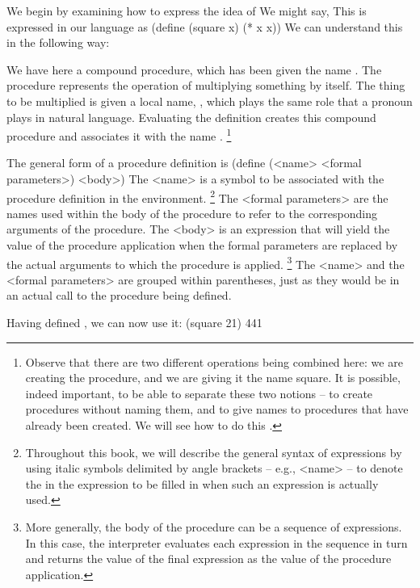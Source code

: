 We begin by examining how to express the idea of 
We might say, 
This is expressed in our language as
\startcode
(define (square x) (* x x))
\stopcode
We can understand this in the following way:

We have here a compound procedure, which has been given the name .
The procedure represents the operation of multiplying something by itself.
The thing to be multiplied is given a local name, ,
which plays the same role that a pronoun plays in natural language.
Evaluating the definition creates this compound procedure and associates it with the name .
\footnote{%
   Observe that there are two different operations being combined here:
   we are creating the procedure, and we are giving it the name square.
   It is possible, indeed important, to be able to separate these two notions
   -- to create procedures without naming them,
   and to give names to procedures that have already been created.
   We will see how to do this .
}

The general form of a procedure definition is
\startcode
(define (<name> <formal parameters>) <body>)
\stopcode
The <name> is a symbol to be associated with the procedure definition in the environment.
\footnote{%
   Throughout this book,
   we will describe the general syntax of expressions by using italic symbols delimited by angle brackets
   -- e.g., <name> --
   to denote the  in the expression to be filled in when such an expression is actually used.
}
The <formal parameters> are the names
used within the body of the procedure to refer to the corresponding arguments of the procedure.
The <body> is an expression
that will yield the value of the procedure application
when the formal parameters are replaced by the actual arguments to which the procedure is applied.
\footnote{%
   More generally, the body of the procedure can be a sequence of expressions.
   In this case,
   the interpreter evaluates each expression in the sequence in turn
   and returns the value of the final expression as the value of the procedure application.
}
The <name> and the <formal parameters> are grouped within parentheses,
just as they would be in an actual call to the procedure being defined.

Having defined , we can now use it:
\startcode
(square 21)
441

